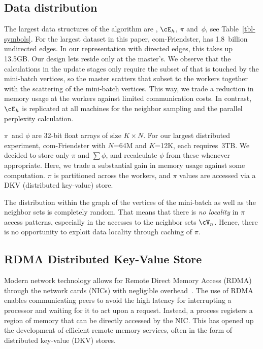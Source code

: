 \subsection{Data distribution}


The largest data structures of the algorithm are \Edges, $\cE_h$, $\pi$
and~$\phi$, see Table~\ref{tbl-symbols}.
For the largest dataset in this paper, com-Friendster, \Edges has 1.8~billion
undirected edges. In our representation with directed edges, this takes
up 13.5GB. Our design lets \Edges reside only at the master's. We observe that
the calculations in the update stages only require the subset of \Edges that
is touched by the mini-batch vertices, so the master scatters that subset to
the workers together with the scattering of the mini-batch vertices. This way,
we trade a reduction in memory usage at the workers against limited
communication costs. In contrast, $\cE_h$ is replicated at
all machines for the neighbor sampling and the parallel perplexity calculation.

$\pi$~and $\phi$ are 32-bit float arrays of size $K \times N$. For our
largest distributed experiment, com-Friendster with $N$=64M and $K$=12K, each
requires~3TB. We decided to store only $\pi$ and $\sum\phi$, and recalculate
$\phi$ from these whenever appropriate. Here, we trade a substantial gain
in memory usage against some computation. $\pi$ is partitioned across the workers,
and $\pi$ values are accessed via a DKV (distributed key-value) store.


The distribution within the graph of the vertices of the mini-batch as well as
the neighbor sets is completely random. That means that there is \textit{no
locality}
in $\pi$ access patterns, especially in the accesses to the neighbor sets
$\Neighbors$.
Hence, there is no opportunity to exploit data locality through caching of
$\pi$.

\subsection{RDMA Distributed Key-Value Store}

Modern network technology allows for Remote Direct Memory Access (RDMA)
through the network cards (NICs) with negligible
overhead~\cite{Hamada_infinibandtrade,Beck:2011:PER:2043535.2043537}. The use
of RDMA enables communicating peers to avoid the high latency for
interrupting a processor and waiting for it to act upon a request. Instead, a
process registers a region of memory that can be directly accessed by the
NIC. %
This has opened up the development of
efficient remote memory services, often in the form of distributed key-value
(DKV) stores.

